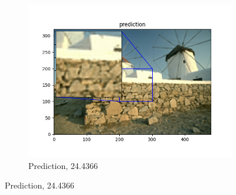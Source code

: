 \documentclass[12pt]{article}
\begin{document}
\begin{figure}[h!]
\begin{subfigure}[b]{0.32\linewidth}
    \includegraphics[width=\linewidth]{./6-prediction.png}
    \caption{Prediction, 24.4366}
  \end{subfigure}


\end{figure}
\end{document}
